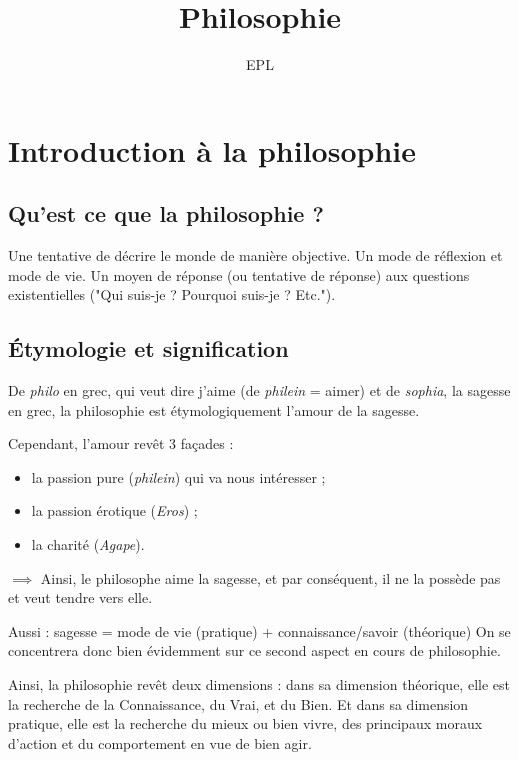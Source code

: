 \documentclass[french]{book}
\theoremstyle{definition}
\begin{document}
\author{EPL}
\title{Philosophie}


\frontmatter
\maketitle
\tableofcontents

\mainmatter

\chapter{Introduction à la philosophie}
\section{Qu'est ce que la philosophie ?}

Une tentative de décrire le monde de manière objective. Un mode de réflexion et mode de vie. Un moyen de réponse (ou tentative de réponse) aux questions existentielles ("Qui suis-je ? Pourquoi suis-je ? Etc.").

\section{Étymologie et signification}

De \textit{philo} en grec, qui veut dire j'aime (de \textit{philein} = aimer) et de \textit{sophia}, la sagesse en grec, la philosophie est étymologiquement l'amour de la sagesse.

Cependant, l'amour revêt 3 façades : \begin{itemize}
	\item la passion pure (\textit{philein}) qui va nous intéresser ; 
	\item la passion érotique (\textit{Eros}) ;
	\item la charité (\textit{Agape}).
\end{itemize}

$\implies$ Ainsi, le philosophe aime la sagesse, et par conséquent, il ne la possède pas et veut tendre vers elle.

Aussi : sagesse = mode de vie (pratique) + connaissance/savoir (théorique)
On se concentrera donc bien évidemment sur ce second aspect en cours de philosophie.

Ainsi, la philosophie revêt deux dimensions : dans sa dimension théorique, elle est la recherche de la Connaissance, du Vrai, et du Bien. Et dans sa dimension pratique, elle est la recherche du mieux ou bien vivre, des principaux moraux d'action et du comportement en vue de bien agir.
\end{document}
